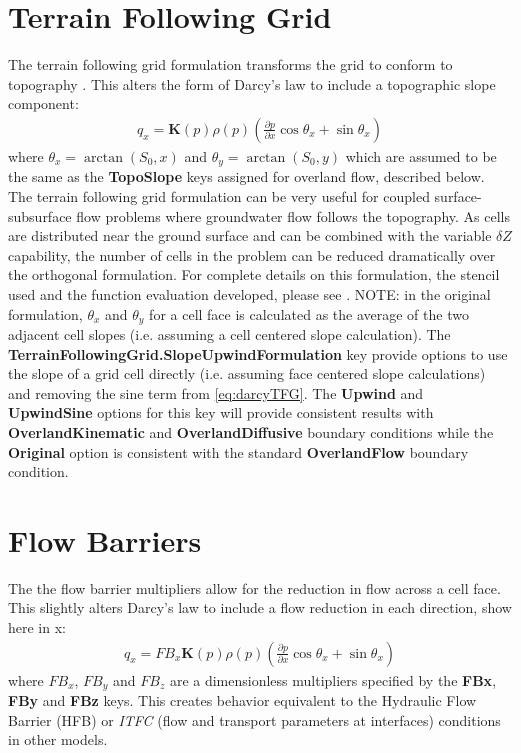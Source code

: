 \section{Terrain Following Grid}
\label{TFG}
The terrain following grid formulation transforms the \parflow{} grid to conform to topography \cite{M13}. This alters the form of Darcy's law to include a topographic slope component:
\begin{eqnarray}
q_x=\textbf{K}(p)\rho(p)(\frac{\partial p}{\partial x}\cos \theta_x + \sin \theta_x)
\label{eq:darcyTFG}
\end{eqnarray}
where $\theta_x = \arctan(S_0,x)$ and $\theta_y = \arctan(S_0,y)$ which are assumed to be the same as the {\bf TopoSlope} keys assigned for overland flow, described below.  The terrain following grid formulation can be very useful for coupled surface-subsurface flow problems where groundwater flow follows the topography.  As cells are distributed near the ground surface and can be combined with the variable $\delta Z$ capability, the number of cells in the problem can be reduced dramatically over the orthogonal formulation. For complete details on this formulation, the stencil used and the function evaluation developed, please see \cite{M13}. NOTE: in the original formulation, $\theta_x$ and $\theta_y$ for a cell face is calculated as the average of the two adjacent cell slopes (i.e. assuming a cell centered slope calculation). The {\bf TerrainFollowingGrid.SlopeUpwindFormulation} key provide options to use the slope of a grid cell directly (i.e. assuming face centered slope calculations) and removing the sine term from  \ref{eq:darcyTFG}. The {\bf Upwind} and {\bf UpwindSine} options for this key will provide consistent results with {\bf OverlandKinematic} and {\bf OverlandDiffusive} boundary conditions while the {\bf Original} option is consistent with the standard {\bf OverlandFlow} boundary condition.

\section{Flow Barriers}
\label{FB}
The the flow barrier multipliers allow for the reduction in flow across a cell face. This slightly alters Darcy's law to include a flow reduction in each direction, show here in x:
\begin{eqnarray}
q_x=FB_x\textbf{K}(p)\rho(p)(\frac{\partial p}{\partial x}\cos \theta_x + \sin \theta_x)
\label{eq:qFBx}
\end{eqnarray}
where $FB_x$, $FB_y$ and $FB_z$ are a dimensionless multipliers specified by the {\bf FBx}, {\bf FBy} and {\bf FBz} keys. This creates behavior equivalent to the Hydraulic Flow Barrier (HFB) or {\em ITFC} (flow and transport parameters at interfaces) conditions in other models.

